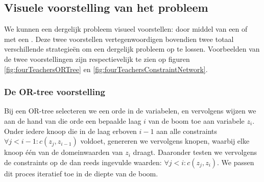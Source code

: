\subsection{Visuele voorstelling van het probleem}
We kunnen een dergelijk probleem visueel voorstellen: door middel van een  of met een . Deze twee voorstellen vertegenwoordigen bovendien twee totaal verschillende strategie\"en om een dergelijk probleem op te lossen. Voorbeelden van de twee voorstellingen zijn respectievelijk te zien op figuren \ref{fig:fourTeachersORTree} en \ref{fig:fourTeachersConstraintNetwork}.
\subsubsection{De OR-tree voorstelling}
Bij een OR-tree selecteren we een orde in de variabelen, en vervolgens wijzen we aan de hand van die orde een bepaalde laag $i$ van de boom toe aan variabele $z_i$. Onder iedere knoop die in de laag erboven $i-1$ aan alle constraints $\forall j<i-1: c\left(z_j,z_{i-1}\right)$ voldoet, genereren we vervolgens knopen, waarbij elke knoop \'e\'en van de domeinwaarden van $z_i$ draagt. Daaronder testen we vervolgens de constraints op de dan reeds ingevulde waarden: $\forall j<i: c\left(z_j,z_{i}\right)$. We passen dit proces iteratief toe in de diepte van de boom.
